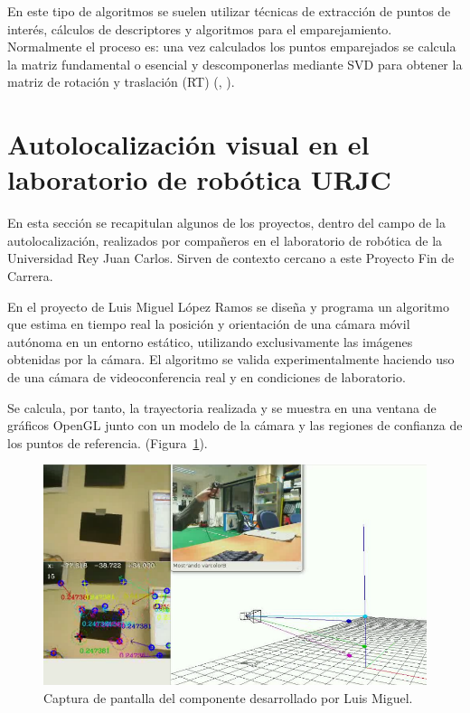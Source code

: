 En este tipo de algoritmos se suelen utilizar técnicas de extracción de puntos de interés, cálculos de descriptores y algoritmos para el emparejamiento. Normalmente el proceso es: una vez calculados los puntos emparejados se calcula la matriz fundamental o esencial y descomponerlas mediante SVD para obtener la matriz de rotación y traslación (RT) (\cite{Reference3}, \cite{Reference4}).

\section{Autolocalización visual en el laboratorio de robótica URJC}

En esta sección se recapitulan algunos de los proyectos, dentro del campo de la autolocalización, realizados por compañeros en el laboratorio de robótica de la Universidad Rey Juan Carlos. Sirven de contexto cercano a este Proyecto Fin de Carrera.

En el proyecto de Luis Miguel López Ramos \parencite{ref1} se diseña y programa un algoritmo que estima en tiempo real la posición y orientación de una cámara móvil autónoma en un entorno estático, utilizando exclusivamente las imágenes obtenidas por la cámara. El algoritmo se valida experimentalmente haciendo uso de una cámara de videoconferencia real y en condiciones de laboratorio.

Se calcula, por tanto, la trayectoria realizada y se muestra en una ventana de gráficos OpenGL junto con un modelo de la cámara y las regiones de confianza de los puntos de referencia. (Figura~\ref{fig:ramos}).

\begin{figure}[th]
\centering
\includegraphics[scale=0.463]{Figures/cap-ramos.png}
\decoRule
\caption[Captura de pantalla, PFC de Luis Miguel]{Captura de pantalla del componente desarrollado por Luis Miguel.}
\label{fig:ramos}
\end{figure}


